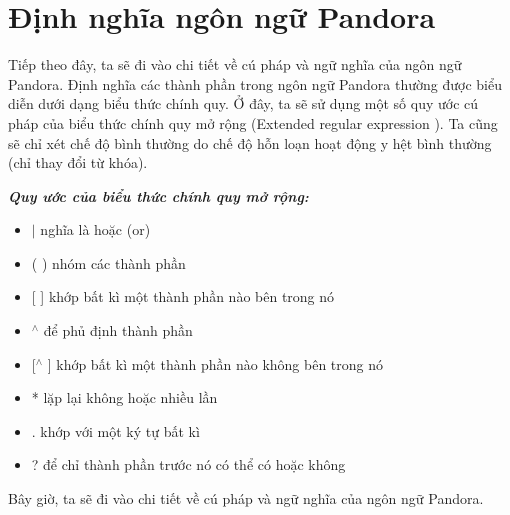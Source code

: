 \section{Định nghĩa ngôn ngữ Pandora}

Tiếp theo đây, ta sẽ đi vào chi tiết về cú pháp và ngữ nghĩa của ngôn ngữ Pandora. Định nghĩa các thành phần trong ngôn ngữ Pandora thường được biểu diễn dưới dạng biểu thức chính quy\cite{li2008regular}. Ở đây, ta sẽ sử dụng một số quy ước cú pháp của biểu thức chính quy mở rộng (Extended regular expression \cite{freydenberger2013extended}). Ta cũng sẽ chỉ xét chế độ bình thường do chế độ hỗn loạn hoạt động y hệt bình thường (chỉ thay đổi từ khóa).

\textbf{\textit{Quy ước của biểu thức chính quy mở rộng:}}

\begin{itemize}
    \item{$|$ nghĩa là hoặc (or)}
    \item{( ) nhóm các thành phần}
    \item{[ ] khớp bất kì một thành phần nào bên trong nó}
    \item{$^\wedge$ để phủ định thành phần}
    \item{[$^\wedge$ ] khớp bất kì một thành phần nào không bên trong nó}
    \item{* lặp lại không hoặc nhiều lần}
    \item{. khớp với một ký tự bất kì}
    \item{? để chỉ thành phần trước nó có thể có hoặc không}
\end{itemize}

Bây giờ, ta sẽ đi vào chi tiết về cú pháp và ngữ nghĩa của ngôn ngữ Pandora.





